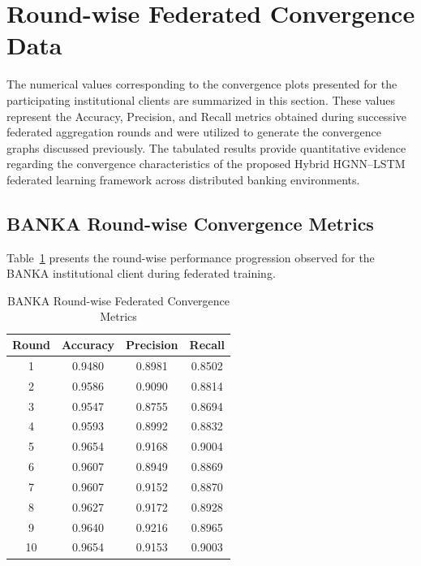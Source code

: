 \section{Round-wise Federated Convergence Data}
\label{sec:federated_convergence_data}

The numerical values corresponding to the convergence plots presented for the participating institutional clients are summarized in this section. These values represent the Accuracy, Precision, and Recall metrics obtained during successive federated aggregation rounds and were utilized to generate the convergence graphs discussed previously. The tabulated results provide quantitative evidence regarding the convergence characteristics of the proposed Hybrid HGNN--LSTM federated learning framework across distributed banking environments.

\subsection{BANKA Round-wise Convergence Metrics}

Table~\ref{tab:banka_round_metrics} presents the round-wise performance progression observed for the BANKA institutional client during federated training.

\begin{table}[H]
\centering
\caption{BANKA Round-wise Federated Convergence Metrics}
\label{tab:banka_round_metrics}
\renewcommand{\arraystretch}{1.2}
\vspace{0.2cm}
\begin{tabular}{|c|c|c|c|}
\hline
\textbf{Round} & \textbf{Accuracy} & \textbf{Precision} & \textbf{Recall} \\
\hline
1 & 0.9480 & 0.8981 & 0.8502 \\
2 & 0.9586 & 0.9090 & 0.8814 \\
3 & 0.9547 & 0.8755 & 0.8694 \\
4 & 0.9593 & 0.8992 & 0.8832 \\
5 & 0.9654 & 0.9168 & 0.9004 \\
6 & 0.9607 & 0.8949 & 0.8869 \\
7 & 0.9607 & 0.9152 & 0.8870 \\
8 & 0.9627 & 0.9172 & 0.8928 \\
9 & 0.9640 & 0.9216 & 0.8965 \\
10 & 0.9654 & 0.9153 & 0.9003 \\
\hline
\end{tabular}
\end{table}

